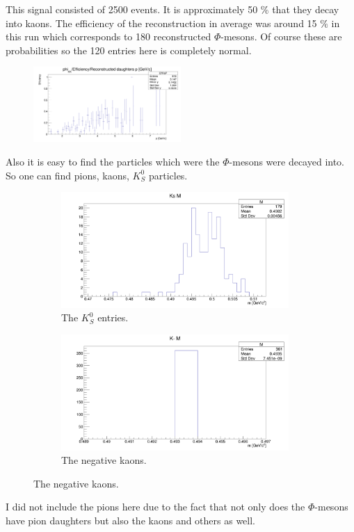 \documentclass[a4paper,12pt]{article}
\begin{document}
\par This signal consisted of 2500 events. It is approximately 50 $\%$ that they decay into kaons. The efficiency 
of the reconstruction in average was around 15 $\%$ in this run which corresponds to 180 reconstructed $\Phi$-mesons.
Of course these are probabilities so the 120 entries here is completely normal.
\begin{figure}[H]
	\centering
	\includegraphics[width=0.5\textwidth]{reconstructed_eff_phi2500.png}
\end{figure}
\par Also it is easy to find the particles which were the $\Phi$-mesons were decayed into. So one can find pions, kaons, $K^{0}_{S}$ particles.
\begin{figure}[H]
	\centering
	\begin{subfigure}{0.49\textwidth}
		\centering
		\includegraphics[width=0.95\textwidth]{kshort_phi2500.png}
		\caption{ The $K^{0}_{S}$ entries. }
	\end{subfigure}
	\begin{subfigure}{0.49\textwidth}
		\centering
		\includegraphics[width=0.95\textwidth]{k-_phi2500.png}
		\caption{ The negative kaons. }
	\end{subfigure}
\end{figure}
\par I did not include the pions here due to the fact that not only does the $\Phi$-mesons have pion
 daughters but also the kaons and others as well.
\end{document}
